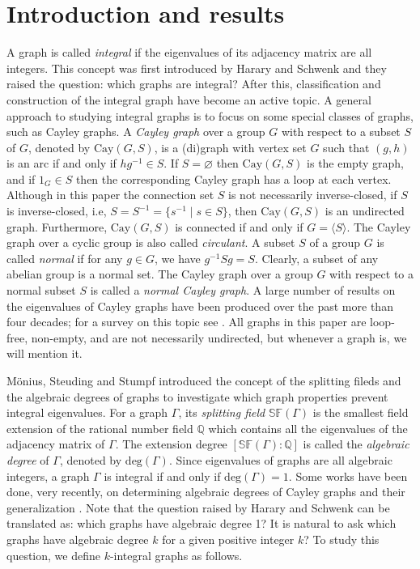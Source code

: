 \documentclass[12pt,a4paper]{article}
\begin{document}
	
	\section{Introduction and results}
	
	A graph is called {\it integral} if the eigenvalues of its adjacency matrix are all integers. 
	This concept was first introduced by Harary and Schwenk \cite{Which Graphs Have Integral Spectra} and they raised the question: which graphs are integral?
	After this, classification and construction of the integral graph have become an active topic. 
	A general approach to studying integral graphs is to focus on some special classes of graphs, such as Cayley graphs.
	A \textit{Cayley graph} over a group $G$ with respect to a subset $S$ of $G$, denoted by $\mathrm{Cay}(G,S)$, is a (di)graph with vertex set $G$ such that $(g,h)$ is an arc if and only if $hg^{-1}\in S$. If $S=\varnothing$ then $\mathrm{Cay}(G,S)$ is the empty graph, and if $1_G\in S$ then the corresponding Cayley graph has a loop at each vertex. 
	 Although in this paper the connection set $S$ is not necessarily inverse-closed, if $S$ is inverse-closed, i.e, $S=S^{-1}=\{s^{-1}\mid s\in S\}$,  then $\mathrm{Cay}(G,S)$ is an undirected graph. Furthermore, $\mathrm{Cay}(G,S)$ is connected  if and only if $G=\langle S\rangle$. 
	The Cayley graph over a cyclic group is also called {\it circulant}.
	A subset $S$ of a group $G$ is called \textit{normal} if for any $g\in G$, we have $g^{-1}Sg=S$. Clearly, a subset of any abelian group is a normal set. 
	The Cayley graph over a group $G$ with respect to a normal subset $S$ is  called a {\it normal Cayley graph}.
	A large number of results on the eigenvalues of Cayley graphs have been produced over the past more than four decades; for a survey on this topic see \cite{LZ}.
	All graphs in this paper are loop-free, non-empty, and are not necessarily undirected, but whenever a graph is, we will mention it.
	
	M\"{o}nius, Steuding and Stumpf \cite{Which graphs have non-integral spectra} introduced the concept  of the splitting fileds and the algebraic degrees of graphs to investigate which graph properties prevent integral eigenvalues.
	For a graph $\Gamma$, its {\it splitting field} $\mathbb{SF}(\Gamma)$ is the smallest field extension of the rational number field $\mathbb{Q}$ which contains all the eigenvalues of the adjacency matrix of $\Gamma$.
	The extension degree $[\mathbb{SF}(\Gamma):\mathbb{Q}]$ is called the {\it algebraic degree} of $\Gamma$, denoted by $\mathrm{deg}(\Gamma)$.
	Since eigenvalues of graphs are all algebraic integers, a graph $\Gamma$ is integral if and only if $\mathrm{deg}(\Gamma)=1$.
	Some works have been done, very recently, on determining algebraic degrees of Cayley graphs and their generalization \cite{Splitting fields of mixed cayley graphs over abelian groups,LM,Algebraic degree of spectra of Cayley hypergraphs,SMT-2, WGYF,WYF}.
	Note that the question raised by Harary and Schwenk can be translated as: which graphs have algebraic degree 1? 
	It is natural to ask which graphs have algebraic degree $k$ for a given positive integer $k$?
	To study this question, we define $k$-integral graphs as follows.
	
\end{document}
